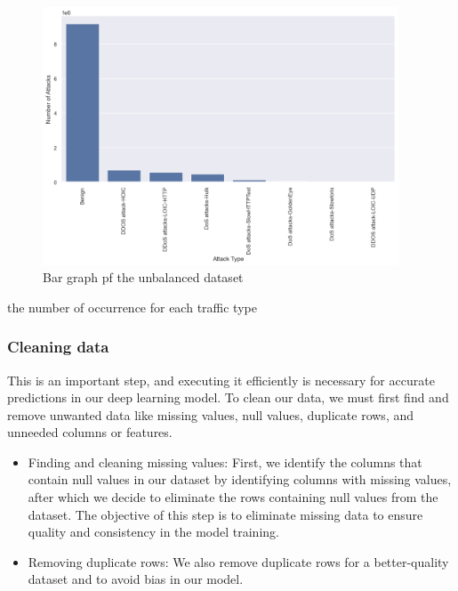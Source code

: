\begin{figure}[h]
	\centering
	\includegraphics[width=400px]{figures/unbalanced_data.png}
	\caption{Bar graph pf the unbalanced dataset}
	\label{fig:unbalanced_data}
\end{figure}

\begin{table}[h]
	\centering
	\caption{the number of occurrence for each traffic type}
	
	\label{tab:unbalanced_data_table} 
\end{table}


\newpage

\subsubsection{Cleaning data}
This is an important step, and executing it efficiently is necessary for accurate predictions in our deep learning model. To clean our data, we must first find and remove unwanted data like missing values, null values, duplicate rows, and unneeded columns or features.



\firmlist
\begin{itemize}
	\item Finding and cleaning missing values: First, we identify the columns that contain null values in our dataset by identifying columns with missing values, after which we decide to eliminate the rows containing null values from the dataset. The objective of this step is to eliminate missing data to ensure quality and consistency in the model training.
	
	\item Removing duplicate rows: We also remove duplicate rows for a better-quality dataset and to avoid bias in our model.
	
\end{itemize}






